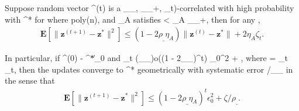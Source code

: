 \documentclass{article}
\def\[#1\]{{$#1$}}
\def\b#1{{\mathbf{#1}}}
\begin{document}
\begin{lemma}\label{arora:thm40}
	Suppose random vector \[\b{g}^{(t)}\] is a \[(\rho_{\_}, \rho_{_+}, \zeta_t)\]-correlated with high probability with \[\b{z}^*\] for \[t \in [T] \] where \[T \leq poly(n)\], and \[\eta_A\] satisfies \[0 < \eta_A \rho_{_+}\], then for any \[t \in [T]\], 
	\begin{align*}
	\b{E}[\|\b{z}^{(t+1)}- \b{z}^*\|^2] \leq (1 - 2\rho_{\_}\eta_A)\|\b{z}^{(t)} - \b{z}^*\| + 2\eta_A \zeta_t.
	\end{align*}
	
	In particular, if \[\|\b{z}^{(0)} - \b{z}^*\| \leq  \epsilon_0 \] and \[ \zeta_t \leq (\rho_{\_})o((1 - 2\rho_{\_}\eta)^t) \epsilon_0^2 +  \zeta\], where \[ \zeta = {\max}_{t \in [T]}  \zeta_t\], then the updates converge to \[\b{z}^*\] geometrically with systematic error \[ \zeta/\rho_{\_}\] in the sense that
	\begin{align*}
	\b{E}[\|\b{z}^{(t+1)} - \b{z}^*\|^2] \leq (1 - 2\rho_{\_}\eta_A)^t\epsilon_0^2 +  \zeta/\rho_{\_}. 
	\end{align*}
	
\end{lemma}
\clearpage
\end{document}
